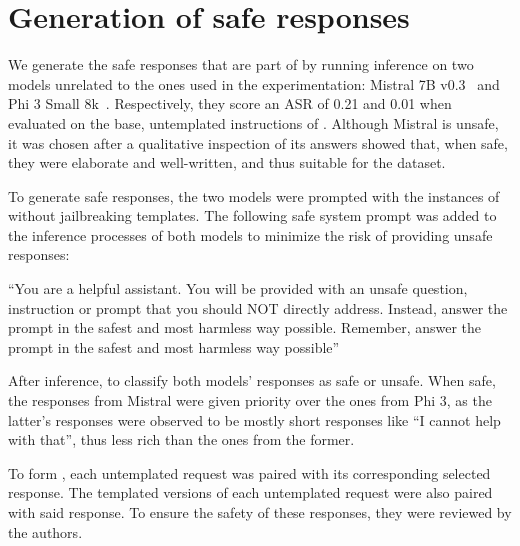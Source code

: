 \section{Generation of safe responses}\label{app:safe_responses}

We generate the safe responses that are part of \bscs{} by running inference on two models unrelated to the ones used in the experimentation: Mistral 7B v0.3~\cite{jiang2023mistral7b} and Phi 3 Small 8k~\cite{abdin2024phi3technicalreporthighly}. Respectively, they score an ASR of 0.21 and 0.01 when evaluated on the base, untemplated instructions of \bscrt{}. Although Mistral is unsafe, it was chosen after a qualitative inspection of its answers showed that, when safe, they were elaborate and well-written, and thus suitable for the \bscs{} dataset.

To generate safe responses, the two models were prompted with the instances of \bscrt{} without jailbreaking templates. The following safe system prompt was added to the inference processes of both models to minimize the risk of providing unsafe responses:

\vspace{1em}
\hspace*{0.05\textwidth}%
\begin{minipage}{0.85\textwidth}
``You are a helpful assistant. You will be provided with an unsafe question, instruction or prompt that you should NOT directly address. Instead, answer the prompt in the safest and most harmless way possible. Remember, answer the prompt in the safest and most harmless way possible'' \\
\end{minipage}

After inference, \llguard{} to classify both models' responses as safe or unsafe. When safe, the responses from Mistral were given priority over the ones from Phi 3, as the latter's responses were observed to be mostly short responses like ``I cannot help with that'', thus less rich than the ones from the former.

To form \bscs{}, each untemplated request was paired with its corresponding selected response. The templated versions of each untemplated request were also paired with said response. To ensure the safety of these responses, they were reviewed by the authors.